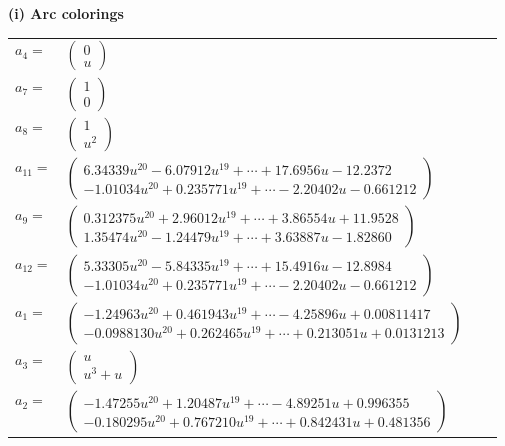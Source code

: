 \documentclass[1p]{elsarticle_modified}
\theoremstyle{definition}
\begin{document}
\flushleft \textbf{(i) Arc colorings}\\
\begin{tabular}{m{7pt} m{180pt} m{7pt} m{180pt} }
\flushright $a_{4}=$&$\begin{pmatrix}0\\u\end{pmatrix}$ \\
\flushright $a_{7}=$&$\begin{pmatrix}1\\0\end{pmatrix}$ \\
\flushright $a_{8}=$&$\begin{pmatrix}1\\u^2\end{pmatrix}$ \\
\flushright $a_{11}=$&$\begin{pmatrix}6.34339 u^{20}-6.07912 u^{19}+\cdots+17.6956 u-12.2372\\-1.01034 u^{20}+0.235771 u^{19}+\cdots-2.20402 u-0.661212\end{pmatrix}$ \\
\flushright $a_{9}=$&$\begin{pmatrix}0.312375 u^{20}+2.96012 u^{19}+\cdots+3.86554 u+11.9528\\1.35474 u^{20}-1.24479 u^{19}+\cdots+3.63887 u-1.82860\end{pmatrix}$ \\
\flushright $a_{12}=$&$\begin{pmatrix}5.33305 u^{20}-5.84335 u^{19}+\cdots+15.4916 u-12.8984\\-1.01034 u^{20}+0.235771 u^{19}+\cdots-2.20402 u-0.661212\end{pmatrix}$ \\
\flushright $a_{1}=$&$\begin{pmatrix}-1.24963 u^{20}+0.461943 u^{19}+\cdots-4.25896 u+0.00811417\\-0.0988130 u^{20}+0.262465 u^{19}+\cdots+0.213051 u+0.0131213\end{pmatrix}$ \\
\flushright $a_{3}=$&$\begin{pmatrix}u\\u^3+u\end{pmatrix}$ \\
\flushright $a_{2}=$&$\begin{pmatrix}-1.47255 u^{20}+1.20487 u^{19}+\cdots-4.89251 u+0.996355\\-0.180295 u^{20}+0.767210 u^{19}+\cdots+0.842431 u+0.481356\end{pmatrix}$ \\

\end{tabular}
\end{document}
